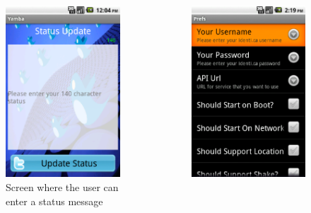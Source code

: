 \begin{frame}
\begin{columns}
\begin{figure}
	\includegraphics[width= 0.8 \textwidth]{fig-31.eps}
	\caption{Screen where the user can enter a status message}
	\end{figure}
	\begin{figure}
	\includegraphics[width= 0.8 \textwidth]{fig-32.eps}

\end{figure}
\end{columns}
\end{frame}
